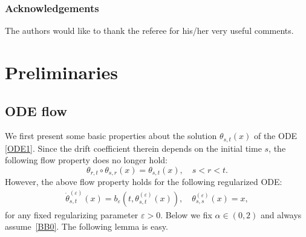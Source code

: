 \documentclass[11pt]{article}
\numberwithin{equation}{section}\providecommand{\asymp}{\mathrel{\sim}}
\theoremstyle{plain}
\theoremstyle{definition}
\let\eps\varepsilon
\newcommand\1{{\mathbf{1}}}
\begin{document}
\subsubsection*{Acknowledgements}
The authors would like to thank the referee for his/her very useful comments.

\section{Preliminaries}
\label{SEC_PRELIM}
\subsection{ODE flow}
We first present some basic properties about the solution $\theta_{s,t}(x)$ of the ODE \eqref{ODE1}. Since the drift coefficient therein
depends on the initial time $s$, the following flow property does no longer hold:
\[
\theta_{r,t}\circ \theta_{s,r}(x)=\theta_{s,t}(x),\quad s<r<t.
\]
However, the above flow property holds for the following regularized ODE:
\begin{align}\label{ODE0}
\dot\theta^{(\eps)}_{s,t}(x)=b_\eps(t,\theta^{(\eps)}_{s,t}(x)),\quad \theta^{(\eps)}_{s,s}(x)=x,
\end{align}
for any fixed regularizing parameter $\eps>0 $.
Below we fix $\alpha\in(0,2)$ and always assume~\eqref{BB0}.
The following lemma is easy.
\end{document}

